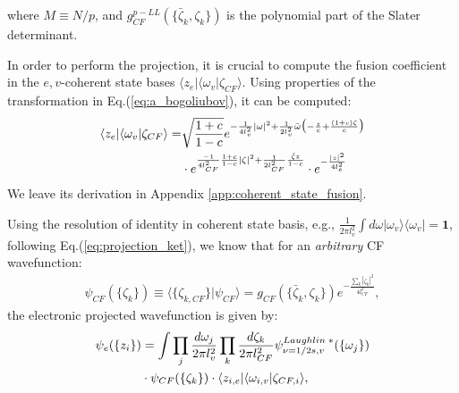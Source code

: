 where $M\equiv N/p$, and $g^{p-LL}_{CF}(\{\bar\zeta_k,\zeta_k\})$ is the polynomial part of the Slater determinant.

In order to perform the projection, it is crucial to compute the fusion coefficient in the $e,v$-coherent state bases $\langle z_e|\langle\omega_v|\zeta_{CF}\rangle$. Using properties of the transformation in Eq.(\ref{eq:a_bogoliubov}), it can be computed:
\begin{align}
    \langle z_e|\langle\omega_v|\zeta_{CF}\rangle = & \sqrt{\frac{1+c}{1-c}}e^{-\frac{1}{4l_v^2}|\omega|^2+\frac{1}{2l_v^2}\bar\omega\big(-\frac{z}{c}+\frac{(1+c) \zeta}{c}\big)}\notag                                          \\
                                                    & \cdot e^{\frac{-1}{4l_{CF}^2}\frac{1+c}{1-c}\left|\zeta\right|^2+\frac{1}{2l_{CF}^2}\frac{\bar\zeta z}{1-c}}\cdot e^{-\frac{|z|^2}{4l_e^2}}\label{eq:coherent_state_fusion}
\end{align}
We leave its derivation in Appendix \ref{app:coherent_state_fusion}.

Using the resolution of identity in coherent state basis, e.g., $\frac{1}{2\pi l_v^2}\int d\omega |\omega_v\rangle\langle\omega_v|=\mathbf 1$, following Eq.(\ref{eq:projection_ket}), we know that for an \emph{arbitrary} CF wavefunction:
\begin{align}
    \psi_{CF}(\{\zeta_k\})\equiv\langle \{\zeta_{k,CF}\}|\psi_{CF}\rangle=g_{CF}(\{\bar\zeta_k,\zeta_k\})e^{-\frac{\sum_k|\zeta_k|^2}{4l_{CF}^2}},
\end{align}
the electronic projected wavefunction is given by:
\begin{align}
    \psi_e(\{z_i\}) & =\int \prod_j \frac{d\omega_j}{2\pi l_v^2} \prod_k \frac{d\zeta_k}{2\pi l_{CF}^2} \psi^{Laughlin \;*}_{\nu=1/2s,v}(\{\omega_j\})\notag \\
                    & \cdot {\psi}_{CF}(\{\zeta_k\})\cdot\langle z_{i,e}|\langle\omega_{i,v}|\zeta_{CF,i}\rangle,
\end{align}

